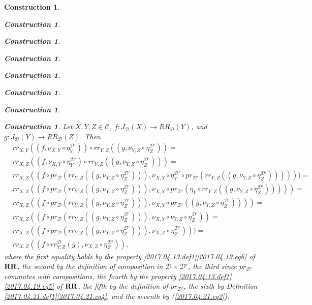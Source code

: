 \documentclass[onecolumn,12pt]{amsart}
\numberwithin{proposition}{subsection}
\newtheorem{construction}[proposition]{Construction}
\newcommand{\sr}{\rightarrow}
\newcommand{\RR}{{\bf RR}}
\newcommand{\C}{{\mathcal C}}
\newcommand{\D}{{\mathcal D}}
\begin{document}
\begin{construction}
\begin{construction}
\begin{construction}
\begin{construction}
\begin{construction}
\begin{construction}
\begin{construction}
\begin{construction}
Let $X,Y,Z\in\C$, $f:J_{\D}(X)\sr RR_{\D}(Y)$, and $g:J_{\D}(Y)\sr RR_{\D}(Z)$.  Then
\begin{equation}
  \label{2017.04.21.eq5}
  \begin{split}
      &rr_{X,Y}((f,\nu_{X,Y}\circ \eta^{\D'}_Y))\circ rr_{Y,Z}((g,\nu_{Y,Z}\circ \eta^{\D'}_Z))=
    \\&rr_{X,Z}((f,\nu_{X,Y}\circ \eta^{\D'}_Y)\circ rr_{Y,Z}((g,\nu_{Y,Z}\circ \eta^{\D'}_Z)))=
    \\&rr_{X,Z}((f\circ pr_{\D}(rr_{Y,Z}((g,\nu_{Y,Z}\circ \eta^{\D'}_Z))),\nu_{X,Y}\circ\eta^{\D'}_Y\circ pr_{\D'}(rr_{Y,Z}((g,\nu_{Y,Z}\circ\eta^{\D'}_Z))) )))=
    \\&rr_{X,Z}((f\circ pr_{\D}(rr_{Y,Z}((g,\nu_{Y,Z}\circ \eta^{\D'}_Z))),\nu_{X,Y}\circ pr_{\D'}(\eta_Y\circ rr_{Y,Z}((g,\nu_{Y,Z}\circ\eta^{\D'}_Z))) ))=
    \\&rr_{X,Z}((f\circ pr_{\D}(rr_{Y,Z}((g,\nu_{Y,Z}\circ \eta^{\D'}_Z))),\nu_{X,Y}\circ pr_{\D'}((g,\nu_{Y,Z}\circ\eta^{\D'}_Z)) ))=
    \\&rr_{X,Z}((f\circ pr_{\D}(rr_{Y,Z}((g,\nu_{Y,Z}\circ \eta^{\D'}_Z))),\nu_{X,Y}\circ\nu_{Y,Z}\circ\eta^{\D'}_Z) )=
    \\&rr_{X,Z}((f\circ pr_{\D}(rr_{Y,Z}((g,\nu_{Y,Z}\circ \eta^{\D'}_Z))),\nu_{X,Z}\circ\eta^{\D'}_Z) ))=
    \\&rr_{X,Z}((f\circ rr^{\D}_{Y,Z}(g),\nu_{X,Z}\circ\eta^{\D'}_Z)),
  \end{split}
\end{equation}%
%
where the first equality holds by the property
\ref{2017.04.13.def1}\ref{2017.04.19.eq6} of $\RR$, the second by the
definition of composition in $\D\times\D'$, the third since $pr_{\D'}$ commutes
with compositions, the fourth by the property
\ref{2017.04.13.def1}\ref{2017.04.19.eq5} of $\RR$, the fifth by the definition
of $pr_{\D'}$, the sixth by Definition
\ref{2017.04.21.def1}\ref{2017.04.21.eq4}, and the seventh by
(\ref{2017.04.21.eq2}).


\end{construction}
\end{construction}
\end{construction}
\end{construction}
\end{construction}
\end{construction}
\end{construction}
\end{construction}
\end{document}
